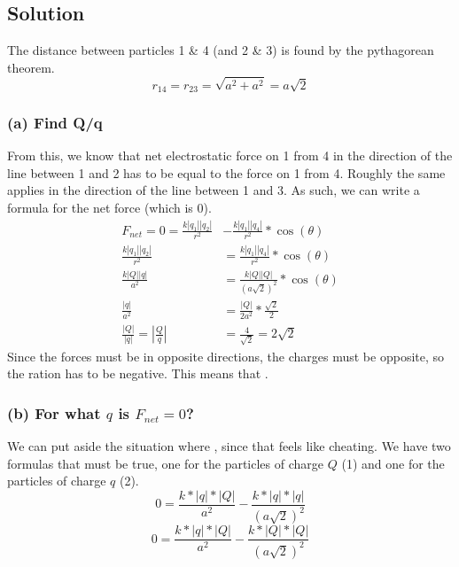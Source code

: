 \documentclass[12pt]{article}
\begin{document}
\subsection*{Solution}
The distance between particles 1 \& 4 (and 2 \& 3) is found by the pythagorean theorem.
\[r_{14} = r_{23} = \sqrt{a^2 + a^2} = a\sqrt{2}\]

\subsubsection*{(a) Find Q/q}
From this, we know that net electrostatic force on 1 from 4 in the direction of the line between 1 and 2 has to be equal to the force on 1 from 4. Roughly the same applies in the direction of the line between 1 and 3. As such, we can write a formula for the net force (which is 0).
\begin{align*}
    F_{net} = 0 = \frac{k\left|q_1\right|\left|q_2\right|}{r^2} &- \frac{k\left|q_1\right|\left|q_4\right|}{r^2}*\cos(\theta)\\
    \frac{k\left|q_1\right|\left|q_2\right|}{r^2} &= \frac{k\left|q_1\right|\left|q_4\right|}{r^2}*\cos(\theta)\\
    \frac{k\left|Q\right|\left|q\right|}{a^2} &= \frac{k\left|Q\right|\left|Q\right|}{(a\sqrt{2})^2}*\cos(\theta)\\
    \frac{\left|q\right|}{a^2} &= \frac{\left|Q\right|}{2a^2}*\frac{\sqrt{2}}{2}\\
    \frac{\left|Q\right|}{\left|q\right|} = \left|\frac{Q}{q}\right| &= \frac{4}{\sqrt{2}} = 2\sqrt{2}
\end{align*}
Since the forces must be in opposite directions, the charges must be opposite, so the ration has to be negative. This means that .

\pagebreak
\subsubsection*{(b) For what $q$ is $F_{net} = 0$?}
We can put aside the situation where , since that feels like cheating. We have two formulas that must be true, one for the particles of charge $Q$ (1) and one for the particles of charge $q$ (2). 
\begin{equation}
    0 = \frac{k*|q|*|Q|}{a^2} - \frac{k*|q|*|q|}{(a\sqrt{2})^2}
\end{equation}
\begin{equation}
    0 = \frac{k*|q|*|Q|}{a^2} - \frac{k*|Q|*|Q|}{(a\sqrt{2})^2}
\end{equation}
\end{document}
